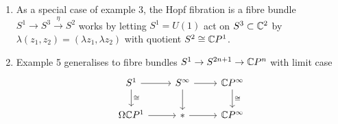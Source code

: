 \documentclass[10pt,a4paper]{article}
\begin{document}
\begin{example}
\begin{enumerate}
\item As a special case of example 3, the Hopf fibration is a fibre bundle $S^1\to S^3\xrightarrow{\eta} S^2$ works by letting $S^1 = U(1)$ act on $S^3 \subset \mathbb{C}^2$ by $\lambda(z_1,z_2) = (\lambda z_1, \lambda z_2)$ with quotient $S^2\cong \mathbb{C} P^1$.

\item Example 5 generalises to fibre bundles $S^1\to S^{2n+1}\to \mathbb{C} P^n$ with limit case
\[\begin{tikzcd}
S^1 \arrow{r}\arrow{d}{\cong} & S^\infty \arrow{r} \arrow{d}& \C P^\infty \arrow{d}{\cong}\\
\Omega \C P^1\arrow{r}& *\arrow{r} &\C P^\infty
\end{tikzcd}\]
\end{enumerate}
\end{example}
\end{document}
